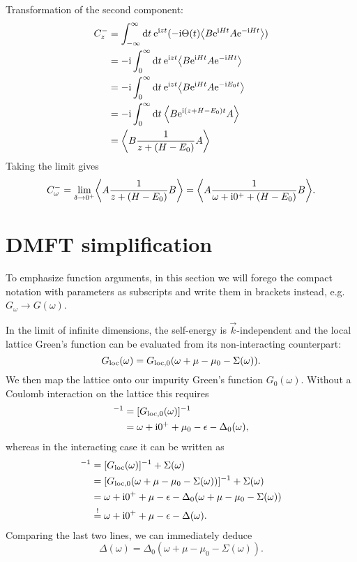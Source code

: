 Transformation of the second component:
\begin{align}
    C^-_z
     & =
    \int_{-\infty}^\infty \md t \>
    \me^{\mi zt}(-\mi \Theta(t) \expval*{B \me^{\mi Ht} A \me^{-\mi Ht}}) \\
     & =
    -\mi \int_0^\infty \md t \>
    \me^{\mi zt} \expval*{B \me^{\mi Ht} A \me^{-\mi Ht}}                 \\
     & =
    -\mi \int_0^\infty \md t \>
    \me^{\mi zt} \expval*{B \me^{\mi Ht} A \me^{-\mi E_0t}}               \\
     & =
    -\mi \int_0^\infty \md t \>
    \expval*{B \me^{\mi(z + H - E_0)t} A}                                 \\
     & =
    \expval*{B \frac{1}{z + (H - E_0)} A}
\end{align}
Taking the limit gives
\begin{equation}
    C^-_\omega
    =
    \lim_{\delta\to0^+} \expval*{A \frac{1}{z + (H - E_0)} B}
    =
    \expval*{A \frac{1}{\omega + \mi0^+ + (H - E_0)} B}.
\end{equation}

\section{DMFT simplification}%
\label{app:dmft-simplification}

To emphasize function arguments,
in this section we will forego the compact notation with parameters as subscripts
and write them in brackets instead,
e.g.\ $G_\omega \to G(\omega)$.

In the limit of infinite dimensions, the self-energy is $\vec{k}$-independent
and the local lattice Green's function can be evaluated from
its non-interacting counterpart:
\begin{equation}
    G_{\mathrm{loc}}(\omega)
    =
    G_{\mathrm{loc},0}(\omega + \mu - \mu_0 - \Sigma(\omega)).
\end{equation}
We then map the lattice onto our impurity Green's function $G_0(\omega)$.
Without a Coulomb interaction on the lattice this requires
\begin{align}
    [G_0(\omega)]^{-1}
     & =
    [G_{\mloc,0}(\omega)]^{-1} \\
     & =
    \omega + \mi0^+ + \mu_0 - \epsilon - \Delta_0(\omega),
\end{align}
whereas in the interacting case it can be written as
\begin{align}
    [G_0(\omega)]^{-1}
     & =
    [G_{\mloc}(\omega)]^{-1} + \Sigma(\omega)                                          \\
     & =
    [G_{\mloc,0}(\omega + \mu - \mu_0 - \Sigma(\omega))]^{-1} + \Sigma(\omega)         \\
     & =
    \omega + \mi0^+ + \mu - \epsilon - \Delta_0(\omega + \mu - \mu_0 - \Sigma(\omega)) \\
     & \stackrel{!}{=}
    \omega + \mi0^+ + \mu - \epsilon - \Delta(\omega).
\end{align}
Comparing the last two lines, we can immediately deduce
\begin{equation}
    \Delta(\omega) = \Delta_0(\omega + \mu - \mu_0 - \Sigma(\omega)).
\end{equation}
